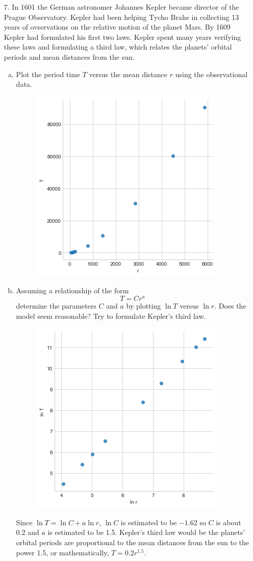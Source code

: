 \documentclass[10pt]{report}
\begin{document}
\begin{enumerate}
	\item [7.]
	In 1601 the German astronomer Johannes Kepler became director of the Prague Observatory. Kepler had been helping Tycho Brahe in collecting 13 years of ovservations on the relative motion of the planet Mars. By 1609 Kepler had formulated his first two laws. Kepler spent many years verifying these laws and formulating a third law, which relates the planets' orbital periods and mean distances from the sun.
	\begin{enumerate}[a.]
		\item 
		Plot the period time $T$ versus the mean distance $r$ using the observational data.
		\begin{figure}[H]
			\centering
			\includegraphics[width=0.4\linewidth]{s3_1/7a.png}
		\end{figure}
		
		\item 
		Assuming a relationship of the form
		\[
		T = C r^a
		\]
		determine the parameters $C$ and $a$ by plotting $\ln{T}$ versus $\ln{r}$. Does the model seem reasonable? Try to formulate Kepler's third law.
		\begin{figure}[H]
			\centering
			\includegraphics[width=0.4\linewidth]{s3_1/7b.png}
		\end{figure}
		Since $\ln{T} = \ln{C} + a \ln{r}$, $\ln{C}$ is estimated to be $-1.62$ so $C$ is about 0.2 and $a$ is estimated to be 1.5. Kepler's third law would be the planets' orbital periods are proportional to the mean distances from the sun to the power 1.5, or mathematically, $T = 0.2 r^{1.5}$.
	\end{enumerate}
\end{enumerate}
\end{document}

